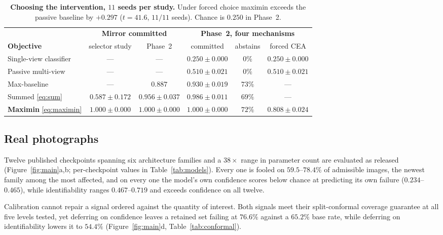 \begin{table}[t]
\caption{\textbf{Choosing the intervention, $11$ seeds per study.} Under forced
choice maximin exceeds the passive baseline by $+0.297$ ($t = 41.6$, $11/11$
seeds). Chance is $0.250$ in Phase~2.}
\label{tab:phase2}
\begin{center}
\footnotesize
\begin{tabular}{lccccc}
\toprule
& \multicolumn{2}{c}{\textbf{Mirror committed}} &
\multicolumn{3}{c}{\textbf{Phase~2, four mechanisms}} \\
\cmidrule(lr){2-3}\cmidrule(lr){4-6}
\textbf{Objective} & selector study & Phase~2 & committed & abstains & forced CEA \\
\midrule
Single-view classifier & --- & --- & $0.250{\pm}0.000$ & $0\%$ & $0.250{\pm}0.000$ \\
Passive multi-view     & --- & --- & $0.510{\pm}0.021$ & $0\%$ & $0.510{\pm}0.021$ \\
Max-baseline           & --- & $0.887$ & $0.930{\pm}0.019$ & $73\%$ & --- \\
Summed \eqref{eq:sum}  & $0.587{\pm}0.172$ & $0.956{\pm}0.037$ & $0.986{\pm}0.011$ & $69\%$ & --- \\
\textbf{Maximin} \eqref{eq:maximin} & $\mathbf{1.000{\pm}0.000}$ & $\mathbf{1.000{\pm}0.000}$ & $\mathbf{1.000{\pm}0.000}$ & $72\%$ & $\mathbf{0.808{\pm}0.024}$ \\
\bottomrule
\end{tabular}
\end{center}
\end{table}

\subsection{Real photographs}
\label{sec:res-universal}

Twelve published checkpoints spanning six architecture families and a $38\times$
range in parameter count are evaluated as released
(Figure~\ref{fig:main}a,b; per-checkpoint values in Table~\ref{tab:models}). Every
one is fooled on $59.5$--$78.4\%$ of admissible images, the newest family among the
most affected, and on every one the model's own confidence scores below chance at
predicting its own failure ($0.234$--$0.465$), while identifiability ranges
$0.467$--$0.719$ and exceeds confidence on all twelve.

Calibration cannot repair a signal ordered against the quantity of interest. Both
signals meet their split-conformal coverage guarantee at all five levels tested,
yet deferring on confidence leaves a retained set failing at $76.6\%$ against a
$65.2\%$ base rate, while deferring on identifiability lowers it to $54.4\%$
(Figure~\ref{fig:main}d, Table~\ref{tab:conformal}).

